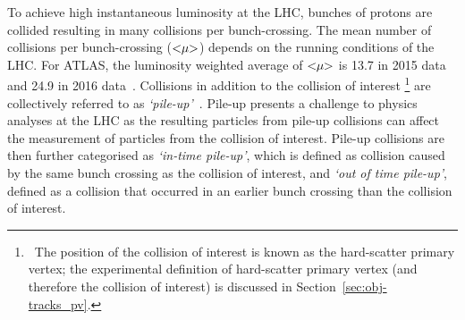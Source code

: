 
To achieve high instantaneous luminosity at the LHC, bunches of protons are collided resulting in many collisions per bunch-crossing.
The mean number of collisions per bunch-crossing ($<\hspace{-3pt}\mu\hspace{-3pt}>$) depends on the running conditions of the LHC.
For ATLAS, the luminosity weighted average of $<\hspace{-3pt}\mu\hspace{-3pt}>$ is 13.7 in 2015 data and 24.9 in 2016 data~\cite{det-ATLAS_lumi_twiki}.
Collisions in addition to the collision of interest
\footnote{\ The position of the collision of interest is known as the hard-scatter primary vertex;
  the experimental definition of hard-scatter primary vertex (and therefore the collision of interest) is discussed in Section~\ref{sec:obj-tracks_pv}.}
are collectively referred to as \textit{`pile-up'}~\cite{det-pileup}.
Pile-up presents a challenge to physics analyses at the LHC
as the resulting particles from pile-up collisions can affect the measurement of particles from the collision of interest.
Pile-up collisions are then further categorised as \textit{`in-time pile-up'},
which is defined as collision caused by the same bunch crossing as the collision of interest,
and \textit{`out of time pile-up'},
defined as a collision that occurred in an earlier bunch crossing than the collision of interest.


